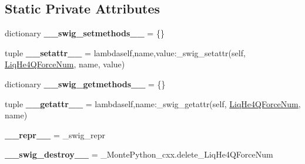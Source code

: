 \subsection*{Static Private Attributes}
\begin{DoxyCompactItemize}
\item 
\hypertarget{classMontePython__cxx_1_1LiqHe4QForceNum_a7c3e74b103d64ef8796cbda3d3f86fde}{}dictionary {\bfseries \+\_\+\+\_\+swig\+\_\+setmethods\+\_\+\+\_\+} = \{\}\label{classMontePython__cxx_1_1LiqHe4QForceNum_a7c3e74b103d64ef8796cbda3d3f86fde}

\item 
\hypertarget{classMontePython__cxx_1_1LiqHe4QForceNum_a5bf48893590dd2b90c3770271ec33f4d}{}tuple {\bfseries \+\_\+\+\_\+setattr\+\_\+\+\_\+} = lambdaself,name,value\+:\+\_\+swig\+\_\+setattr(self, \hyperlink{classMontePython__cxx_1_1LiqHe4QForceNum}{Liq\+He4\+Q\+Force\+Num}, name, value)\label{classMontePython__cxx_1_1LiqHe4QForceNum_a5bf48893590dd2b90c3770271ec33f4d}

\item 
\hypertarget{classMontePython__cxx_1_1LiqHe4QForceNum_af57fd2bdfeb3de46731c0299dc2db5ac}{}dictionary {\bfseries \+\_\+\+\_\+swig\+\_\+getmethods\+\_\+\+\_\+} = \{\}\label{classMontePython__cxx_1_1LiqHe4QForceNum_af57fd2bdfeb3de46731c0299dc2db5ac}

\item 
\hypertarget{classMontePython__cxx_1_1LiqHe4QForceNum_a5c654d8ee497ce330aa82d9f2058ee11}{}tuple {\bfseries \+\_\+\+\_\+getattr\+\_\+\+\_\+} = lambdaself,name\+:\+\_\+swig\+\_\+getattr(self, \hyperlink{classMontePython__cxx_1_1LiqHe4QForceNum}{Liq\+He4\+Q\+Force\+Num}, name)\label{classMontePython__cxx_1_1LiqHe4QForceNum_a5c654d8ee497ce330aa82d9f2058ee11}

\item 
\hypertarget{classMontePython__cxx_1_1LiqHe4QForceNum_a01508a5ffd2f4d0d4e35a9f923b2ef41}{}{\bfseries \+\_\+\+\_\+repr\+\_\+\+\_\+} = \+\_\+swig\+\_\+repr\label{classMontePython__cxx_1_1LiqHe4QForceNum_a01508a5ffd2f4d0d4e35a9f923b2ef41}

\item 
\hypertarget{classMontePython__cxx_1_1LiqHe4QForceNum_a0f049222801f5f320806afc3b96ed877}{}{\bfseries \+\_\+\+\_\+swig\+\_\+destroy\+\_\+\+\_\+} = \+\_\+\+Monte\+Python\+\_\+cxx.\+delete\+\_\+\+Liq\+He4\+Q\+Force\+Num\label{classMontePython__cxx_1_1LiqHe4QForceNum_a0f049222801f5f320806afc3b96ed877}

\end{DoxyCompactItemize}


